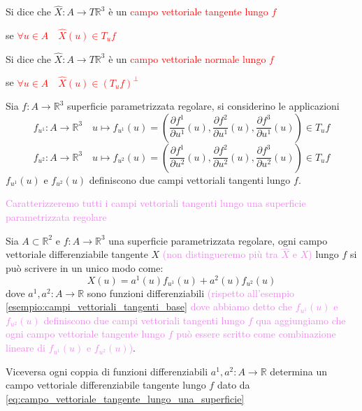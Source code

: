         \begin{definizione}
        \mbox{}

        Si dice che $\hat{X} \colon A \to T \mathbb{R}^3$ è un \textcolor{red}{campo vettoriale tangente lungo $f$} 
        
        se \textcolor{red}{$\forall u \in A \quad \hat{X}(u) \in T_u f$}
        
        Si dice che $\hat{X} \colon A \to T \mathbb{R}^3$ è un \textcolor{red}{campo vettoriale normale lungo $f$} 

        se \textcolor{red}{$\forall u \in A \quad \hat{X}(u) \in \left(T_u f\right)^\perp$}
        \end{definizione}
        \begin{esempio}
        \label{esempio:campi_vettoriali_tangenti_base}
        Sia $f \colon A \to \mathbb{R}^3$ superficie parametrizzata regolare, si considerino le applicazioni 
        \[ f_{u^1} \colon A \to \mathbb{R}^3 \quad u \mapsto f_{u^1}(u) = \left( \frac{\partial f^1}{\partial u^1}(u), \frac{\partial f^2}{\partial u^1}(u), \frac{\partial f^3}{\partial u^1}(u) \right) \in T_u f \]
        \[ f_{u^2} \colon A \to \mathbb{R}^3 \quad u \mapsto f_{u^2}(u) = \left( \frac{\partial f^1}{\partial u^2}(u), \frac{\partial f^2}{\partial u^2}(u), \frac{\partial f^3}{\partial u^2}(u) \right) \in T_u f \]
        $f_{u^1}(u)$ e $f_{u^2}(u)$ definiscono due campi vettoriali tangenti lungo $f$.
        \end{esempio}
        \newpage
        \textcolor{violet}{Caratterizzeremo tutti i campi vettoriali tangenti lungo una superficie parametrizzata regolare}
        \begin{proposizione}
        Sia $A \subset \mathbb{R}^2$ e $f \colon A \to \mathbb{R}^3$ una superficie parametrizzata regolare, ogni campo vettoriale differenziabile 
        tangente $X$ \textcolor{violet}{(non distingueremo più tra $\hat{X}$ e $X$)} lungo $f$ si può scrivere in un unico modo come:
        \begin{equation}
        \label{eq:campo_vettoriale_tangente_lungo_una_superficie}
        X(u) = a^1(u) f_{u^1}(u) + a^2(u) f_{u^2}(u) 
        \end{equation}
        dove $a^1, a^2 \colon A \to \mathbb{R}$ sono funzioni differenziabili \textcolor{violet}{(rispetto all'esempio \ref{esempio:campi_vettoriali_tangenti_base} 
        dove abbiamo detto che $f_{u^1}(u)$ e $f_{u^2}(u)$ definiscono due campi vettoriali tangenti lungo $f$ qua aggiungiamo 
        che ogni campo vettoriale tangente lungo $f$ può essere scritto come combinazione lineare di $f_{u^1}(u)$ e $f_{u^2}(u)$)}.

        Viceversa ogni coppia di funzioni differenziabili $a^1, a^2 \colon A \to \mathbb{R}$ determina 
        un campo vettoriale differenziabile tangente lungo $f$ dato da \eqref{eq:campo_vettoriale_tangente_lungo_una_superficie}
        \end{proposizione}
